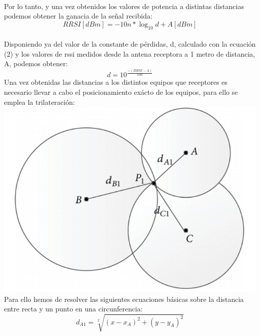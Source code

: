 \documentclass[a4paper ,12pt, onecolumn]{article}
\begin{document}
                \paragraph{}
                Por lo tanto, y una vez obtenidos los valores de potencia a distintas distancias podemos obtener la ganacia
                de la señal recibida:
                \begin{equation}
                    RRSI [dBm] = -10n*\log_{10} d+ A[dBm]
                \end{equation}
                \paragraph{}
                Disponiendo ya del valor de la constante de pérdidas, d, calculado con la ecuación (2) y los valores
                de rssi medidos desde la antena receptora a 1 metro de distancia, A, podemos obtener:
                \begin{equation}
                    d= 10^\frac{-(RRSI - A)}{10n}
                \end{equation}
                Una vez obtenidas las distancias a los distintos equipos que receptores es necesario llevar a cabo el
                posicionamiento exácto de los equipos, para ello se emplea la trilateración:
                \includegraphics[scale=0.3]{trilateration_circle.png}
                Para ello hemos de resolver las siguientes ecuaciones básicas sobre la distancia entre recta y un punto en 
                una circunferencia:
                \begin{equation}
                    d_{A1}= \sqrt[2]{(x-x_A)^2+(y-y_A)^2}
                \end{equation}
\end{document}
